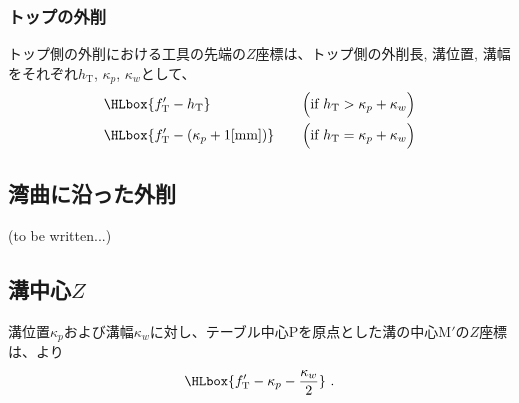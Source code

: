 \subsubsection{トップの外削}
トップ側の外削における工具の先端の$Z$座標は、トップ側の外削長, 溝位置, 溝幅をそれぞれ$h_\mathrm T$, $\kappa_p$, $\kappa_w$として、
\begin{alignat*}{3}
  & \HLbox{f_\mathrm T'-h_\mathrm T} & \quad & \Big(\text{if}~h_\mathrm T > \kappa_p+\kappa_w\Big)\\
  & \HLbox{f_\mathrm T'-\left(\kappa_p+1[\mathrm{mm}]\right)} & \quad  & \Big(\text{if}~h_\mathrm T = \kappa_p+\kappa_w\Big)
\end{alignat*}


\subsection{湾曲に沿った外削\TBW}
(to be written...)


\clearpage

\subsection{溝中心\texorpdfstring{$Z$}{Z}}
溝位置$\kappa_p$および溝幅$\kappa_w$に対し、テーブル中心Pを原点とした溝の中心M$'$の$Z$座標は、より
\begin{align*}
  \HLbox{f_\mathrm T'-\kappa_p-\frac{\kappa_w}2}\ .
\end{align*}

